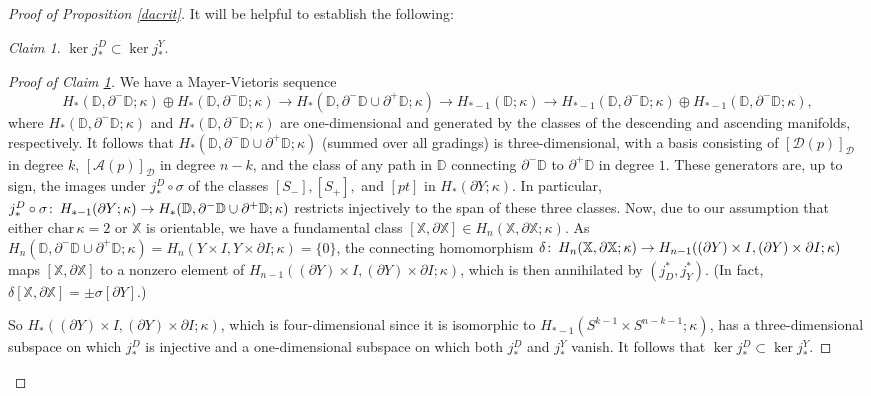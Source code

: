 \documentclass[11pt]{amsart}
\theoremstyle{definition}
\theoremstyle{remark}
\newtheorem{claim}[theorem]{Claim}
\numberwithin{equation}{section}
\def\co{\colon\thinspace}
\begin{document}
\begin{proof}[Proof of Proposition \ref{dacrit}]
	
	It will be helpful to establish the following:
	\begin{claim}\label{jdjy}
		$\ker j^{D}_{*}\subset \ker j^{Y}_{*}$.
	\end{claim}
	\begin{proof}[Proof of Claim \ref{jdjy}]
		We have a Mayer-Vietoris sequence \[  
		H_{*}(\mathbb{D},\partial^-\mathbb{D};\kappa)\oplus H_{*}(\mathbb{D},\partial^-\mathbb{D};\kappa)\to H_*(\mathbb{D},\partial^-\mathbb{D}\cup\partial^+\mathbb{D};\kappa)\to H_{*-1}(\mathbb{D};\kappa)\to H_{*-1}(\mathbb{D},\partial^-\mathbb{D};\kappa)\oplus H_{*-1}(\mathbb{D},\partial^-\mathbb{D};\kappa), \] where
		$H_{*}(\mathbb{D},\partial^-\mathbb{D};\kappa)$ and $H_{*}(\mathbb{D},\partial^-\mathbb{D};\kappa)$ are one-dimensional and generated by the classes of the descending and ascending manifolds, respectively.  It follows that $H_*(\mathbb{D},\partial^-\mathbb{D}\cup\partial^+\mathbb{D};\kappa)$ (summed over all gradings) is three-dimensional, with a basis consisting of $[\mathcal{D}(p)]_{\mathcal{D}}$ in degree $k$, $[\mathcal{A}(p)]_{\mathcal{D}}$ in degree $n-k$, and the class of any path in $\mathbb{D}$ connecting $\partial^-\mathbb{D}$ to $\partial^+\mathbb{D}$ in degree $1$.   These generators are, up to sign, the images under $j^{D}_{*}\circ \sigma$ of the classes $[S_-],[S_+],$ and $[pt]$ in $H_*(\partial Y;\kappa)$.  In particular, $j^{D}_{*}\circ\sigma\co H_{*-1}(\partial Y;\kappa)\to H_*(\mathbb{D},\partial^-\mathbb{D}\cup\partial^+\mathbb{D};\kappa)$ restricts injectively to the span of these three classes.  Now, due to our assumption that either $\mathrm{char}\,\kappa=2$ or $\mathbb{X}$ is orientable, we have a fundamental class $[\mathbb{X},\partial \mathbb{X}]\in H_{n}(\mathbb{X},\partial\mathbb{X};\kappa)$.  As $H_n(\mathbb{D},\partial^-\mathbb{D}\cup\partial^+\mathbb{D};\kappa)=H_n(Y\times I,Y\times\partial I;\kappa)=\{0\}$, the connecting homomorphism $\delta\co H_{n}(\mathbb{X},\partial\mathbb{X};\kappa)\to  H_{n-1}((\partial Y)\times I,(\partial Y)\times\partial I;\kappa)$ maps $[\mathbb{X},\partial \mathbb{X}]$ to a nonzero element of   $H_{n-1}((\partial Y)\times I,(\partial Y)\times\partial I;\kappa)$, which is then annihilated by $(j^{*}_{D},j^{*}_{Y})$.  (In fact, $\delta[\mathbb{X},\partial \mathbb{X}]=\pm\sigma[\partial Y]$.)  
		
		So $H_*((\partial Y)\times I,(\partial Y)\times \partial I;\kappa)$, which is four-dimensional since it is isomorphic to $H_{*-1}(S^{k-1}\times S^{n-k-1};\kappa)$,  has  a three-dimensional subspace on which $j_{*}^{D}$ is injective and a one-dimensional subspace on which both $j_{*}^{D}$ and $j_{*}^{Y}$ vanish.  It follows that $\ker j_{*}^{D}\subset \ker j_{*}^{Y}$.     
	\end{proof}


\end{proof}
\end{document}

